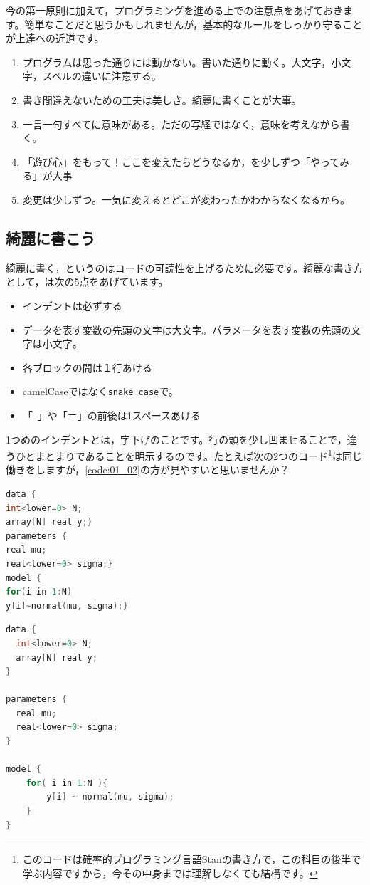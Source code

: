 \documentclass{ltjsbook}
\begin{document}
今の第一原則に加えて，プログラミングを進める上での注意点をあげておきます。簡単なことだと思うかもしれませんが，基本的なルールをしっかり守ることが上達への近道です。
\begin{enumerate}
	\item プログラムは思った通りには動かない。書いた通りに動く。大文字，小文字，スペルの違いに注意する。
	\item 書き間違えないための工夫は美しさ。綺麗に書くことが大事。
	\item 一言一句すべてに意味がある。ただの写経ではなく，意味を考えながら書く。
	\item 「遊び心」をもって！ここを変えたらどうなるか，を少しずつ「やってみる」が大事
	\item 変更は少しずつ。一気に変えるとどこが変わったかわからなくなるから。
\end{enumerate}

\subsection{綺麗に書こう}
綺麗に書く，というのはコードの可読性を上げるために必要です。綺麗な書き方として，\textcite{Matsuura201610}は次の5点をあげています。

\begin{itemize}
	\item インデントは必ずする
	\item データを表す変数の先頭の文字は大文字。パラメータを表す変数の先頭の文字は小文字。
	\item 各ブロックの間は１行あける
	\item camelCaseではなく\verb|snake_case|で。
	\item 「~」や「＝」の前後は1スペースあける
\end{itemize}

1つめのインデントとは，字下げのことです。行の頭を少し凹ませることで，違うひとまとまりであることを明示するのです。たとえば次の2つのコード\footnote{このコードは確率的プログラミング言語Stanの書き方で，この科目の後半で学ぶ内容ですから，今その中身までは理解しなくても結構です。}は同じ働きをしますが，\ref{code:01_02}の方が見やすいと思いませんか？
\begin{lstlisting}[language=c++,label={code:01_01},caption={インデントのないコード}]
data {
int<lower=0> N;
array[N] real y;}
parameters {
real mu;
real<lower=0> sigma;}
model {
for(i in 1:N)
y[i]~normal(mu, sigma);}
\end{lstlisting}


\begin{lstlisting}[language=c++,label={code:01_02},caption={インデントのあるコード}]
data {
  int<lower=0> N;
  array[N] real y;
}

parameters {
  real mu;
  real<lower=0> sigma;
}

model {
    for( i in 1:N ){
        y[i] ~ normal(mu, sigma);
    }
}
\end{lstlisting}
\end{document}
